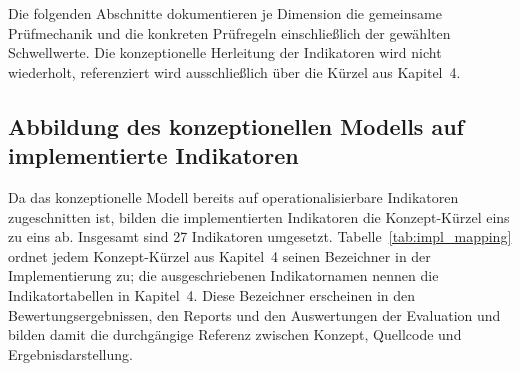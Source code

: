Die folgenden Abschnitte dokumentieren je Dimension die gemeinsame Prüfmechanik und die konkreten Prüfregeln einschließlich der gewählten Schwellwerte. Die konzeptionelle Herleitung der Indikatoren wird nicht wiederholt, referenziert wird ausschließlich über die Kürzel aus Kapitel~4.

\subsection{Abbildung des konzeptionellen Modells auf implementierte Indikatoren}

Da das konzeptionelle Modell bereits auf operationalisierbare Indikatoren zugeschnitten ist, bilden die implementierten Indikatoren die Konzept-Kürzel eins zu eins ab. Insgesamt sind 27 Indikatoren umgesetzt. Tabelle~\ref{tab:impl_mapping} ordnet jedem Konzept-Kürzel aus Kapitel~4 seinen Bezeichner in der Implementierung zu; die ausgeschriebenen Indikatornamen nennen die Indikatortabellen in Kapitel~4. Diese Bezeichner erscheinen in den Bewertungsergebnissen, den Reports und den Auswertungen der Evaluation und bilden damit die durchgängige Referenz zwischen Konzept, Quellcode und Ergebnisdarstellung.


